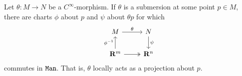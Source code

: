 
\begin{theorem}
\label{thm:submersion}
Let \(\theta: M \to N\) be a \(C^{\infty}\)-morphism. If \(\theta\) is a
submersion at some point \(p \in M\), there are charts \(\phi\) about \(p\) and
\(\psi\) about \(\theta p\) for which
\[
\begin{tikzcd}
M \ar[r, "\theta"] &N \ar[d, "\psi"] \\
\R^m \ar[u, "\phi^{-1}"] \ar[r, two heads] &\R^n
\end{tikzcd}
\]
commutes in \({\texttt{Man}}\). That is, \(\theta\) locally acts as a projection about
\(p\).
\end{theorem}

